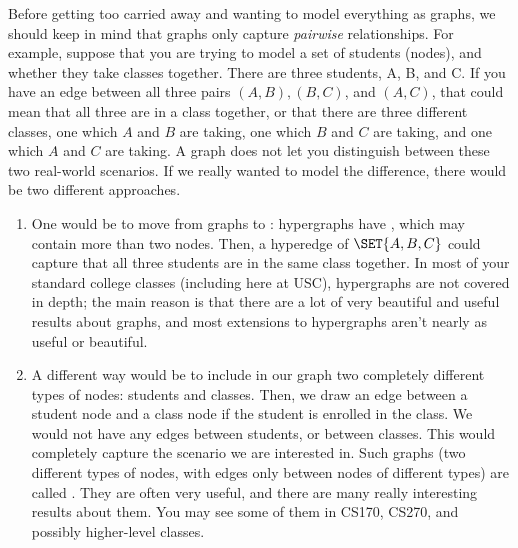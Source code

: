 Before getting too carried away and wanting to model everything as
graphs, we should keep in mind that graphs only capture
\emph{pairwise} relationships. 
For example, suppose that you are trying to model a set of
students (nodes), and whether they take classes together.
There are three students, A, B, and C. If you have an edge between all
three pairs $(A,B), (B,C)$, and $(A,C)$, that could mean that all
three are in a class together, or that there are three different
classes, one which $A$ and $B$ are taking, one which $B$ and $C$ are
taking, and one which $A$ and $C$ are taking. A graph does not let you
distinguish between these two real-world scenarios.
If we really wanted to model the difference, there would be two
different approaches. 
\begin{enumerate}
\item One would be to move from graphs to
: hypergraphs have , which may
contain more than two nodes. Then, a hyperedge of $\SET{A,B,C}$ could
capture that all three students are in the same class together.
In most of your standard college classes (including here at USC),
hypergraphs are not covered in depth; the main reason is that there are
a lot of very beautiful and useful results about graphs, and most
extensions to hypergraphs aren't nearly as useful or beautiful.
\item A different way would be to include in our graph two completely
  different types of nodes: students and classes. Then, we draw an
  edge between a student node and a class node if the student is
  enrolled in the class. We would not have any edges between students,
  or between classes. This would completely capture the scenario we
  are interested in. Such graphs (two different types of nodes, with
  edges only between nodes of different types) are called
  . They are often very useful, and there are many
  really interesting results about them. You may see some of them in
  CS170, CS270, and possibly higher-level classes.
\end{enumerate}

